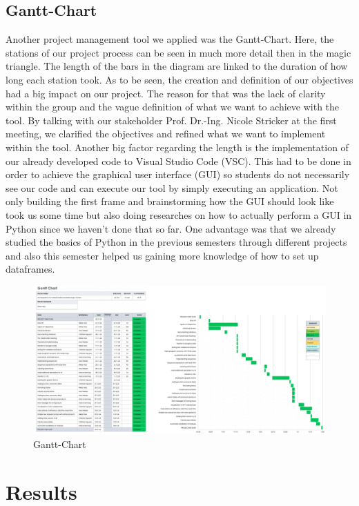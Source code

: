 \subsection{Gantt-Chart}
Another project management tool we applied was the Gantt-Chart. Here, the stations of our project process can be seen in much more detail then in the magic triangle. The length of the bars in the diagram are linked to the duration of how long each station took. As to be seen, the creation and definition of our objectives had a big impact on our project. The reason for that was the lack of clarity within the group and the vague definition of what we want to achieve with the tool. By talking with our stakeholder Prof. Dr.-Ing. Nicole Stricker at the first meeting, we clarified the objectives and refined what we want to implement within the tool. Another big factor regarding the length is the implementation of our already developed code to Visual Studio Code (VSC). This had to be done in order to achieve the graphical user interface (GUI) so students do not necessarily see our code and can execute our tool by simply executing an application. Not only building the first frame and brainstorming how the GUI should look like took us some time but also doing researches on how to actually perform a GUI in Python since we haven't done that so far. One advantage was that we already studied the basics of Python in the previous semesters through different projects and also this semester helped us gaining more knowledge of how to set up dataframes. 
\begin{figure}[H]
\includegraphics[width=\linewidth]{Abbildungen/Gantt_Chart.png}	
\caption{Gantt-Chart}
\label{fig:Gantt_Chart}
\end{figure}
\section{Results}

